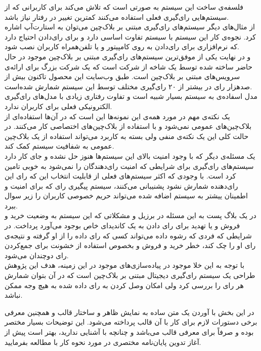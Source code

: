 فلسفه‌ی ساخت این سیستم به صورتی است که تلاش می‌کند برای کاربرانی که از سیستم‌هایی رای‌گیری فعلی استفاده می‌کنند کمترین تغییر در رفتار نیاز باشد. 
\\
از مثال‌های دیگر سیستم‌های رای‌گیری مبتنی بر بلاک‌چین می‌توان به استارت‌آپ 
اشاره کرد. نجوه‌ی کار این سیستم با سیستم 
تفاوت اساسی دارد و برای رای‌دادن احتیاج دارد که نرم‌‌افزاری برای رای‌دادن به روی کامپیتور و یا تلفن‌همراه کاربران نصب شود. 
\\
و در نهایت یکی از موفق‌ترین سیستم‌های رای‌گیری مبتنی بر بلاک‌چین موجود در حال حاضر 
ساخته شده توسط یک شاخه از شرکت 
است که یک شرکت بزرگ برای ارائه‌ی سرویس‌های مبتنی بر بلاک‌چین است. طبق وب‌سایت این محصول تاکنون بیش از صدهزار رای در بیشتر از ۲۰ رای‌گیری مختلف توسط این سیستم‌ شمارش شده‌است. 
\\
مدل اسفاده‌ی 
به سیستم‌ 
بسیار شبیه است و تفاوت رفتاری زیادی با مدل‌های رای‌گیری الکترونیکی فعلی برای کاربران ندارد. 
\\
یک نکته‌ی مهم در مورد همه‌ی این نمونه‌ها این است که در آن‌ها استفاده‌ای از بلاک‌چین‌های عمومی نمی‌شود و با استفاده از بلاک‌چین‌های اختصاصی کار می‌کنند. در حالت کلی این یک نکته‌ی منفی ولی بسته‌ به کاربرد می‌تواند استفاده‌ از یک بلاک‌چین عمومی به شفافیت سیستم کمک کند.
\\
یک مسئله‌ی دیگر که با وجود امنیت بالای این سیستم‌ها هنوز حل نشده و جای کار دارد سیستم‌های رای‌گیری برای شرایطی که امنیت رای‌دهندگان را نمی‌شود به خوبی تامین کرد است. با وجودی که اکثر سیستم‌های فعلی از قابلیت انتخاب این که رای این رای‌دهنده شمارش نشود پشنیبانی می‌کنند، سیستم پیگیری رای که برای امنیت و اطمینان ییشتر به سیستم اضافه شده می‌تواند حریم خصوصی کاربران را زیر سوال ببرد.
\\ 
در یک بلاگ پست به این مسئله در برزیل و مشکلاتی که این سیستم به وضعیت خرید و فروش و یا تهدید برای رای دادن به یک کاندیدای خاص بوجود می‌آورد پرداخت. در شرایطی که فردی که رشوه داده می‌تواند 
کسی که رای داده را از او گرفته و نتیجه‌ی رای او را چک کند، خطر خرید و فروش و بخصوص استفاده از خشونت برای جمع‌کردن رای دوچندان می‌شود. 
\\
با توجه به این خلا موجود در پیاده‌سازی‌های موجود در این زمینه، هدف این پژوهش طراحی یک سیستم رای‌گیری دیجیتال مبتنی بر بلاک‌چین است که در آن بتوان شمارش هر رای را بررسی کرد ولی امکان وصل کردن به رای داده شده به هیچ وجه ممکن نباشد. 






در این بخش با آوردن یک متن ساده به نمایش ظاهر و ساختار قالب و همچنین معرفی برخی دستورات لازم برای کار با آن قالب پرداخته می‌شود. این توضیحات بسیار مختصر بوده و صرفاً برای معرفی قالب می‌باشد و چنانچه با  آشنایی ندارید، بهتر است پیش از آغاز تدوین پایان‌نامه مختصری در مورد نحوه کار با  مطالعه بفرمایید.
